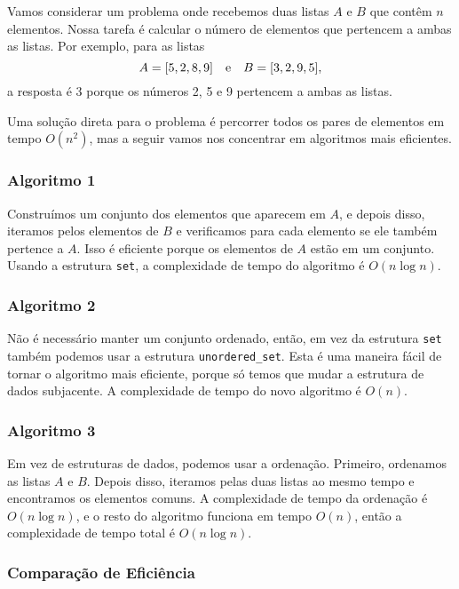 Vamos considerar um problema onde
recebemos duas listas $A$ e $B$
que contêm $n$ elementos.
Nossa tarefa é calcular o número de elementos
que pertencem a ambas as listas.
Por exemplo, para as listas
\[A = [5,2,8,9] \hspace{10px} \textrm{e} \hspace{10px} B = [3,2,9,5],\]
a resposta é 3 porque os números 2, 5
e 9 pertencem a ambas as listas.

Uma solução direta para o problema é
percorrer todos os pares de elementos em tempo $O(n^2)$,
mas a seguir vamos nos concentrar em
algoritmos mais eficientes.

\subsubsection{Algoritmo 1}

Construímos um conjunto dos elementos que aparecem em $A$,
e depois disso, iteramos pelos elementos
de $B$ e verificamos para cada elemento se ele
também pertence a $A$.
Isso é eficiente porque os elementos de $A$
estão em um conjunto.
Usando a estrutura \texttt{set},
a complexidade de tempo do algoritmo é $O(n \log n)$.

\subsubsection{Algoritmo 2}

Não é necessário manter um conjunto ordenado,
então, em vez da estrutura \texttt{set}
também podemos usar a estrutura \texttt{unordered\_set}.
Esta é uma maneira fácil de tornar o algoritmo
mais eficiente, porque só temos que mudar
a estrutura de dados subjacente.
A complexidade de tempo do novo algoritmo é $O(n)$.

\subsubsection{Algoritmo 3}

Em vez de estruturas de dados, podemos usar a ordenação.
Primeiro, ordenamos as listas $A$ e $B$.
Depois disso, iteramos pelas duas listas
ao mesmo tempo e encontramos os elementos comuns.
A complexidade de tempo da ordenação é $O(n \log n)$,
e o resto do algoritmo funciona em tempo $O(n)$,
então a complexidade de tempo total é $O(n \log n)$.

\subsubsection{Comparação de Eficiência}

